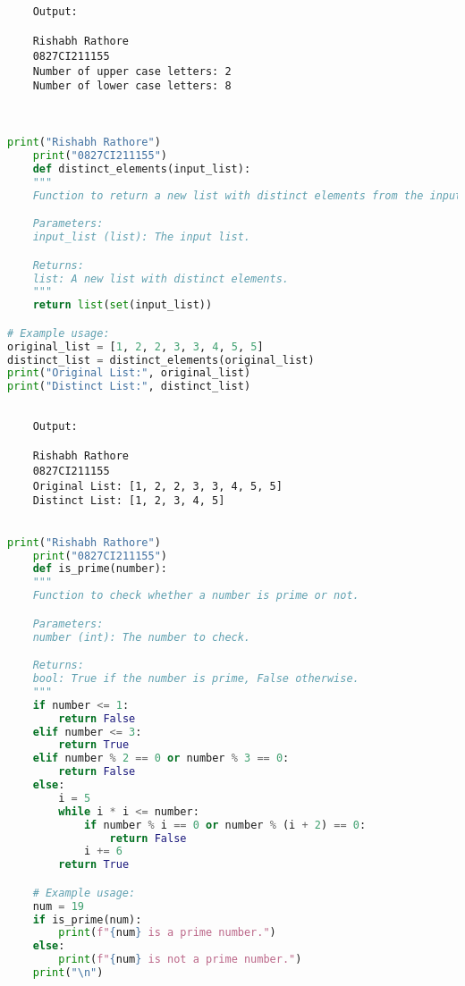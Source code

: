 \documentclass{report}
\begin{document}
\begin{verbatim}
	Output:

	Rishabh Rathore
	0827CI211155
	Number of upper case letters: 2
	Number of lower case letters: 8
	
	

\end{verbatim}


\newpage


\sol 
\begin{lstlisting}[language=Python]
	print("Rishabh Rathore")
	print("0827CI211155")
	def distinct_elements(input_list):
    """
    Function to return a new list with distinct elements from the input list.

    Parameters:
    input_list (list): The input list.

    Returns:
    list: A new list with distinct elements.
    """
    return list(set(input_list))

# Example usage:
original_list = [1, 2, 2, 3, 3, 4, 5, 5]
distinct_list = distinct_elements(original_list)
print("Original List:", original_list)
print("Distinct List:", distinct_list)
  

\end{lstlisting}

\begin{verbatim}
	Output:

	Rishabh Rathore
	0827CI211155
	Original List: [1, 2, 2, 3, 3, 4, 5, 5]
	Distinct List: [1, 2, 3, 4, 5]


\end{verbatim}


\newpage


\sol 
\begin{lstlisting}[language=Python]
	print("Rishabh Rathore")
	print("0827CI211155")
	def is_prime(number):
    """
    Function to check whether a number is prime or not.

    Parameters:
    number (int): The number to check.

    Returns:
    bool: True if the number is prime, False otherwise.
    """
    if number <= 1:
        return False
    elif number <= 3:
        return True
    elif number % 2 == 0 or number % 3 == 0:
        return False
    else:
        i = 5
        while i * i <= number:
            if number % i == 0 or number % (i + 2) == 0:
                return False
            i += 6
        return True

	# Example usage:
	num = 19
	if is_prime(num):
		print(f"{num} is a prime number.")
	else:
		print(f"{num} is not a prime number.")
	print("\n")
\end{lstlisting}
\end{document}
